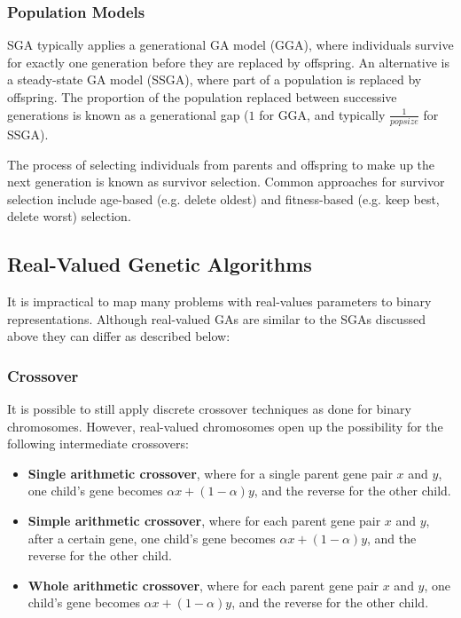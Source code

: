 \documentclass[12pt,titlepage]{article}
\begin{document}
      \subsubsection{Population Models}
        SGA typically applies a generational GA model (GGA), where individuals survive for exactly one generation before they are replaced by offspring. An alternative is a
        steady-state GA model (SSGA), where part of a population is replaced by offspring. The proportion of the population replaced between successive generations is known as a
        generational gap ($1$ for GGA, and typically $\frac{1}{popsize}$ for SSGA).

        The process of selecting individuals from parents and offspring to make up the next generation is known as survivor selection. Common approaches for survivor selection
        include age-based (e.g. delete oldest) and fitness-based (e.g. keep best, delete worst) selection.

    \subsection{Real-Valued Genetic Algorithms}
      It is impractical to map many problems with real-values parameters to binary representations. Although real-valued GAs are similar to the SGAs discussed above they can
      differ as described below:

      \subsubsection{Crossover}
        It is possible to still apply discrete crossover techniques as done for binary chromosomes. However, real-valued chromosomes open up the possibility for the following
        intermediate crossovers:
        \begin{itemize}
          \item \textbf{Single arithmetic crossover}, where for a single parent gene pair $x$ and $y$, one child's gene becomes $\alpha x + (1 - \alpha) y$, and the reverse for the other child. 
          \item \textbf{Simple arithmetic crossover}, where for each parent gene pair $x$ and $y$, after a certain gene, one child's gene becomes $\alpha x + (1 - \alpha) y$, and the reverse
            for the other child. 
          \item \textbf{Whole arithmetic crossover}, where for each parent gene pair $x$ and $y$, one child's gene becomes $\alpha x + (1 - \alpha) y$, and the reverse for the other child.
        \end{itemize}
\end{document}
